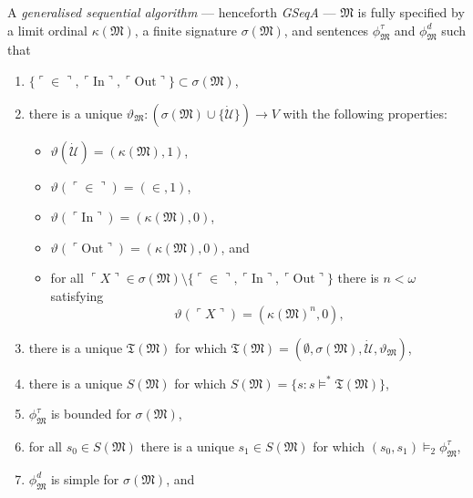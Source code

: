 \documentclass[12pt]{article}
\numberwithin{equation}{section}
\begin{document}
\begin{defi}\label{def224}
A \emph{generalised sequential algorithm} --- henceforth \textit{GSeqA} --- $\mathfrak{M}$ is fully specified by a limit ordinal $\kappa(\mathfrak{M})$, a finite signature $\sigma(\mathfrak{M})$, and sentences $\phi^{\tau}_{\mathfrak{M}}$ and $\phi^d_{\mathfrak{M}}$ such that
\begin{enumerate}[label=(D\arabic*)]
    \item $\{\ulcorner \in \urcorner, \ulcorner \mathrm{In} \urcorner, \ulcorner \mathrm{Out} \urcorner\} \subset \sigma(\mathfrak{M})$,
    \item there is a unique $\vartheta_{\mathfrak{M}} : (\sigma(\mathfrak{M}) \cup \{\dot{\mathcal{U}}\}) \longrightarrow V$ with the following properties:
    \begin{itemize}
        \item $\vartheta(\dot{\mathcal{U}}) = (\kappa(\mathfrak{M}), 1)$,
        \item $\vartheta(\ulcorner \in \urcorner) = (\in, 1)$,
        \item $\vartheta(\ulcorner \mathrm{In} \urcorner) = (\kappa(\mathfrak{M}), 0)$,
        \item $\vartheta(\ulcorner \mathrm{Out} \urcorner) = (\kappa(\mathfrak{M}), 0)$, and
        \item for all $\ulcorner X \urcorner \in \sigma(\mathfrak{M}) \setminus \{\ulcorner \in \urcorner, \ulcorner \mathrm{In} \urcorner, \ulcorner \mathrm{Out} \urcorner\}$ there is $n < \omega$ satisfying 
        \begin{equation*}
            \vartheta(\ulcorner X \urcorner) = (\kappa(\mathfrak{M})^n, 0) \text{,}
        \end{equation*}
    \end{itemize}
    \item there is a unique $\mathfrak{T}(\mathfrak{M})$ for which $\mathfrak{T}(\mathfrak{M}) = (\emptyset, \sigma(\mathfrak{M}), \dot{\mathcal{U}}, \vartheta_{\mathfrak{M}})$,
    \item there is a unique $S(\mathfrak{M})$ for which $S(\mathfrak{M}) = \{s : s \models^* \mathfrak{T}(\mathfrak{M})\}$,
    \item\label{8222d5} $\phi^{\tau}_{\mathfrak{M}}$ is bounded for $\sigma(\mathfrak{M})$, 
    \item for all $s_0 \in S(\mathfrak{M})$ there is a unique $s_1 \in S(\mathfrak{M})$ for which $(s_0, s_1) \models_2 \phi^{\tau}_{\mathfrak{M}}$,
    \item $\phi^d_{\mathfrak{M}}$ is simple for $\sigma(\mathfrak{M})$, and

\end{enumerate}
\end{defi}
\end{document}
